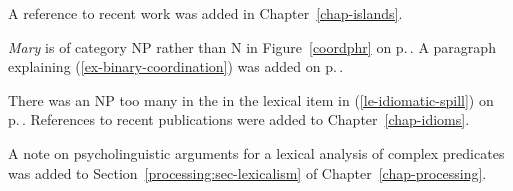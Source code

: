 


A reference to recent work was added in Chapter~\ref{chap-islands}.

\emph{Mary} is of category NP rather than N in Figure~\ref{coordphr} on p.\,\pageref{coordphr}. A
paragraph explaining (\ref{ex-binary-coordination}) was added on p.\,\pageref{ex-binary-coordination}.
%

%



There was an NP too many in the \compsl in the lexical item in (\ref{le-idiomatic-spill}) on
p.\,\pageref{le-idiomatic-spill}. 
References to recent publications were added to Chapter~\ref{chap-idioms}.








A note on psycholinguistic arguments for a lexical analysis of complex predicates was added to
Section~\ref{processing:sec-lexicalism} of Chapter~\ref{chap-processing}. 

%
%









%
%
%
%
%
%
%
%



